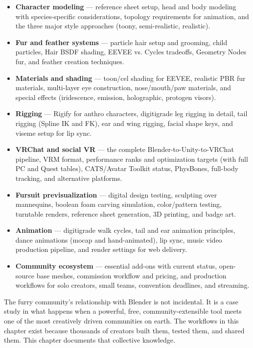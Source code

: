 \begin{itemize}[leftmargin=2em]
  \item \textbf{Character modeling} --- reference sheet setup, head and body modeling with species-specific considerations, topology requirements for animation, and the three major style approaches (toony, semi-realistic, realistic).

  \item \textbf{Fur and feather systems} --- particle hair setup and grooming, child particles, Hair BSDF shading, EEVEE vs. Cycles tradeoffs, Geometry Nodes fur, and feather creation techniques.

  \item \textbf{Materials and shading} --- toon/cel shading for EEVEE, realistic PBR fur materials, multi-layer eye construction, nose/mouth/paw materials, and special effects (iridescence, emission, holographic, protogen visors).

  \item \textbf{Rigging} --- Rigify for anthro characters, digitigrade leg rigging in detail, tail rigging (Spline IK and FK), ear and wing rigging, facial shape keys, and viseme setup for lip sync.

  \item \textbf{VRChat and social VR} --- the complete Blender-to-Unity-to-VRChat pipeline, VRM format, performance ranks and optimization targets (with full PC and Quest tables), CATS/Avatar Toolkit status, PhysBones, full-body tracking, and alternative platforms.

  \item \textbf{Fursuit previsualization} --- digital design testing, sculpting over mannequins, boolean foam carving simulation, color/pattern testing, turntable renders, reference sheet generation, 3D printing, and badge art.

  \item \textbf{Animation} --- digitigrade walk cycles, tail and ear animation principles, dance animations (mocap and hand-animated), lip sync, music video production pipeline, and render settings for web delivery.

  \item \textbf{Community ecosystem} --- essential add-ons with current status, open-source base meshes, commission workflow and pricing, and production workflows for solo creators, small teams, convention deadlines, and streaming.
\end{itemize}

The furry community's relationship with Blender is not incidental. It is a case study in what happens when a powerful, free, community-extensible tool meets one of the most creatively driven communities on earth. The workflows in this chapter exist because thousands of creators built them, tested them, and shared them. This chapter documents that collective knowledge.
